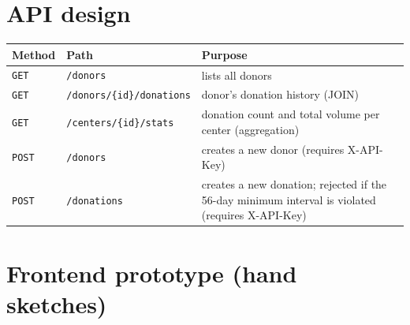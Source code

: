 \documentclass[11pt,a4paper]{article}
\begin{document}
\section{API design}

\renewcommand{\arraystretch}{1.2}
\begin{tabularx}{\linewidth}{@{}p{2cm}p{4cm}X@{}}
\toprule
\textbf{Method} & \textbf{Path} & \textbf{Purpose} \\
\midrule
\texttt{GET}  & \texttt{/donors} & lists all donors \\
\texttt{GET}  & \texttt{/donors/\{id\}/donations} & donor's donation history (JOIN) \\
\texttt{GET}  & \texttt{/centers/\{id\}/stats} & donation count and total volume per center (aggregation) \\
\texttt{POST} & \texttt{/donors} & creates a new donor (requires X-API-Key) \\
\texttt{POST} & \texttt{/donations} & creates a new donation; rejected if the 56-day minimum interval is violated (requires X-API-Key) \\
\bottomrule
\end{tabularx}

\section{Frontend prototype (hand sketches)}
\end{document}
